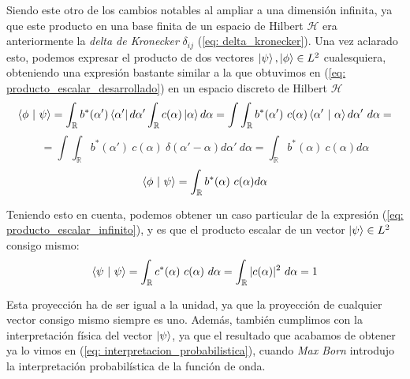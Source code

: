 \documentclass[12pt]{article}
\numberwithin{equation}{section} %
\begin{document}
    \vspace{2.5mm}

    Siendo este otro de los cambios notables al ampliar a una dimensión infinita, ya que este producto en una base finita de un espacio de Hilbert \( \mathcal{H} \) era anteriormente la \textit{delta de Kronecker} \( \delta_{ij} \) (\ref{eq: delta_kronecker}). Una vez aclarado esto, podemos expresar el producto de dos vectores \( \ket{\psi}, \ket{\phi} \in L^{2} \) cualesquiera, obteniendo una expresión bastante similar a la que obtuvimos en (\ref{eq: producto_escalar_desarrollado}) en un espacio discreto de Hilbert \( \mathcal{H} \)
    \begin{equation*}
        \braket{\phi \ | \ \psi} = \int_{\mathbb{R}} b^{*} (\alpha') \bra{\alpha'} d \alpha' \int_{\mathbb{R}} c (\alpha) \ket{\alpha} d \alpha = \int\int_{\mathbb{R}} b^{*} (\alpha') \ c (\alpha) \braket{\alpha' \ | \ \alpha} d \alpha' \ d \alpha =
    \end{equation*}
    \begin{equation*}
        = \int\int_{\mathbb{R}} b^{*} (\alpha') \ c (\alpha) \ \delta(\alpha' - \alpha) d \alpha' \ d \alpha = \int_{\mathbb{R}} b^{*} (\alpha) \ c (\alpha) d \alpha
    \end{equation*}
    \begin{equation}
        \braket{\phi \ | \ \psi} = \int_{\mathbb{R}} b^{*} (\alpha) \ c (\alpha) d \alpha
        \label{eq: producto_escalar_infinito}
    \end{equation}

    \vspace{2.5mm}

    Teniendo esto en cuenta, podemos obtener un caso particular de la expresión (\ref{eq: producto_escalar_infinito}), y es que el producto escalar de un vector \( \ket{\psi} \in L^{2} \) consigo mismo:
    \begin{equation}
        \braket{\psi \ | \ \psi} = \int_{\mathbb{R}} c^{*} (\alpha) \ c (\alpha) \ d \alpha = \int_{\mathbb{R}} | c (\alpha) | ^ {2} \ d \alpha = 1
        \label{eq: producto_escalar_vector_mismo_l2}
    \end{equation}

    \vspace{2.5mm}

    Esta proyección ha de ser igual a la unidad, ya que la proyección de cualquier vector consigo mismo siempre es uno. Además, también cumplimos con la interpretación física del vector \( \ket{\psi} \), ya que el resultado que acabamos de obtener ya lo vimos en (\ref{eq: interpretacion_probabilistica}), cuando \textit{Max Born} introdujo la interpretación probabilística de la función de onda.
\end{document}
